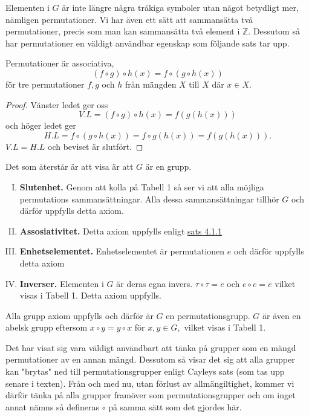 \documentclass{article}
\theoremstyle{definition}
\begin{document}
Elementen i $G$ är inte längre några tråkiga symboler utan något betydligt mer, nämligen permutationer. 
Vi har även ett sätt att sammansätta två permutationer, precis som man kan sammansätta två element
i $\mathbb{Z}.$ Dessutom så har permutationer en väldigt användbar egenskap som följande sats 
tar upp. 
\hypertarget{ass}{}
\begin{mytheo}{}{}
  Permutationer är associativa,
  \[(f \circ g) \circ h(x) = f \circ (g \circ h(x))\]
  för tre permutationer $f, g$ och $h$ från mängden $X$ till $X$ där $x \in X.$
\end{mytheo}
\begin{proof}
  Vänster ledet ger oss 
  \[V.L = (f \circ g) \circ h(x) = f(g(h(x)))\]
  och höger ledet ger 
  \[H.L = f \circ (g \circ h(x)) = f \circ g(h(x)) = f(g(h(x))).\]
  $V.L = H.L$ och beviset är slutfört.
\end{proof}

Det som återstår är att visa är att $G$ är en grupp. 
\begin{enumerate}[I)]
  \item \textbf{Slutenhet.} Genom att kolla på Tabell 1 så ser vi att alla möjliga permutations
  sammansättningar. Alla dessa sammansättningar tillhör $G$ och därför uppfylls detta axiom.
  \item \textbf{Assosiativitet.} Detta axiom uppfylls enligt \hyperlink{ass}{sats 4.1.1}
  \item \textbf{Enhetselementet.} Enhetselementet är 
  permutationen $e$ och därför uppfylls detta axiom
  \item \textbf{Inverser.} Elementen i $G$ är deras egna invers. $\tau \circ \tau = e$ och 
  $e \circ e = e$ vilket visas i Tabell 1. Detta axiom uppfylls.
\end{enumerate}
Alla grupp axiom uppfylls och därför är $G$ en permutationsgrupp. $G$ är även en abelsk grupp 
eftersom $x \circ y = y \circ x$ för $x, y \in G,$ vilket visas i Tabell 1.

Det har visat sig vara väldigt användbart att tänka på grupper som en mängd permutationer av en 
annan mängd. Dessutom så visar det sig att alla grupper kan "brytas" ned till permutationsgrupper
enligt Cayleys sats (som tas upp senare i texten).
Från och med nu, utan förlust av allmängiltighet, kommer vi därför tänka på alla grupper framöver
som permutationsgrupper och om inget annat nämns så defineras $\circ$ på samma sätt som det 
gjordes här.
\end{document}
